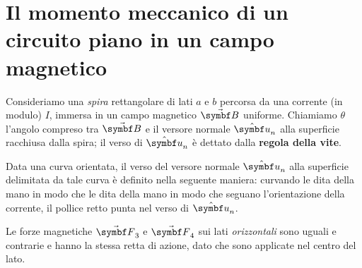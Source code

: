 \section{Il momento meccanico di un circuito piano in un campo magnetico}\label{spirarettangolaremeccanica}
Consideriamo una \textit{spira} rettangolare di lati $a$ e $b$ percorsa da una corrente (in modulo) $I$, immersa in un campo magnetico $\vba{B}$ uniforme. Chiamiamo $\theta$ l'angolo compreso tra $\vba{B}$ e il versore normale $\vbh{u}_n$ alla superficie racchiusa dalla spira; il verso di $\vbh{u}_n$ è dettato dalla \textbf{regola della vite}.
\begin{define}
Data una curva orientata, il verso del versore normale $\vbh{u}_n$ alla superficie delimitata da tale curva è definito nella seguente maniera: curvando le dita della mano in modo che le dita della mano in modo che seguano l'orientazione della corrente, il pollice retto punta nel verso di $\vbh{u}_n$.
\end{define}
Le forze magnetiche $\vba{F}_3$ e $\vba{F}_4$ sui lati \textit{orizzontali} sono uguali e contrarie e hanno la stessa retta di azione, dato che sono applicate nel centro del lato.
